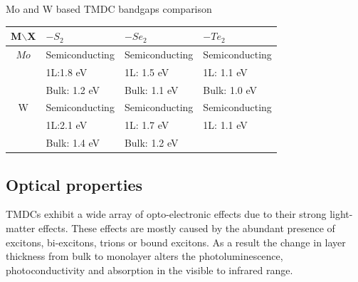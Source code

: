 \documentclass[12pt]{article}
\begin{document}
	 \begin{table}[h]
	 \caption{Mo and W based TMDC bandgaps comparison}
	 \label{tab:MoWBandgapsComparison}
	 \end{table}
	 
	 \begin{center}
	 \begin{tabular}{c|l|l|l}
	 
	 M$\backslash$X & $-S_2$ 			& $-Se_2$ 	& $-Te_2$\\ \hline
	 $Mo$ 			& Semiconducting	& Semiconducting	& Semiconducting	\\ 
	 				& 1L:1.8 eV			& 1L: 1.5 eV		& 1L: 1.1 eV		\\
	 				& Bulk: 1.2 eV		& Bulk: 1.1 eV		& Bulk: 1.0 eV		\\ \hline
	 W 				& Semiconducting	& Semiconducting	& Semiconducting	\\
	 				& 1L:2.1 eV			& 1L: 1.7 eV		& 1L: 1.1 eV		\\
	 				& Bulk: 1.4 eV		& Bulk: 1.2 eV		& 					\\
	 
	 \end{tabular}
	 \end{center}
	
	
	\subsection{Optical properties}
	\label{subsec:Optical properties}

	TMDCs exhibit a wide array of opto-electronic effects due to their strong light-matter effects. These effects are mostly caused by the abundant presence of excitons, bi-excitons, trions or bound excitons. As a result the change in layer thickness from bulk to monolayer alters the photoluminescence, photoconductivity and absorption in the visible to infrared range.
		
\end{document}
